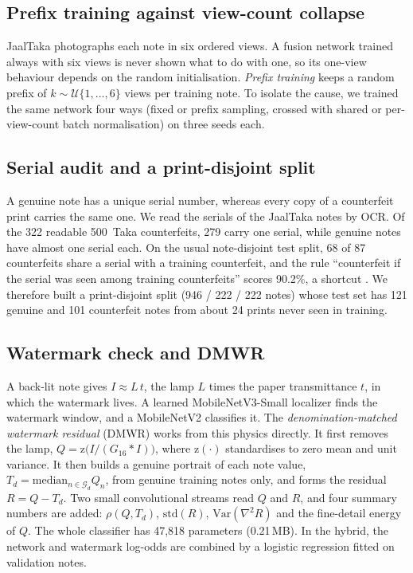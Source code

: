 \documentclass[conference]{IEEEtran}
\begin{document}
\subsection{Prefix training against view-count collapse}
JaalTaka photographs each note in six ordered views. A fusion network trained always with six views is never shown what to do with one, so its one-view behaviour depends on the random initialisation. \emph{Prefix training} keeps a random prefix of $k\sim\mathcal{U}\{1,\dots,6\}$ views per training note. To isolate the cause, we trained the same network four ways (fixed or prefix sampling, crossed with shared or per-view-count batch normalisation) on three seeds each.

\subsection{Serial audit and a print-disjoint split}
A genuine note has a unique serial number, whereas every copy of a counterfeit print carries the same one. We read the serials of the JaalTaka notes by OCR. Of the 322 readable 500~Taka counterfeits, 279 carry one serial, while genuine notes have almost one serial each. On the usual note-disjoint test split, 68 of 87 counterfeits share a serial with a training counterfeit, and the rule ``counterfeit if the serial was seen among training counterfeits'' scores 90.2\%, a shortcut \cite{geirhos2020shortcut}. We therefore built a print-disjoint split (946 / 222 / 222 notes) whose test set has 121 genuine and 101 counterfeit notes from about 24 prints never seen in training.

\subsection{Watermark check and DMWR}
A back-lit note gives $I\approx L\,t$, the lamp $L$ times the paper transmittance $t$, in which the watermark lives. A learned MobileNetV3-Small localizer \cite{mobilenetv3} finds the watermark window, and a MobileNetV2 \cite{mobilenetv2} classifies it. The \emph{denomination-matched watermark residual} (DMWR) works from this physics directly. It first removes the lamp, $Q=\mathrm{z}\big(I/(G_{16}*I)\big)$, where $\mathrm{z}(\cdot)$ standardises to zero mean and unit variance. It then builds a genuine portrait of each note value, $T_d=\mathrm{median}_{n\in\mathcal{G}_d}Q_n$, from genuine training notes only, and forms the residual $R=Q-T_d$. Two small convolutional streams read $Q$ and $R$, and four summary numbers are added: $\rho(Q,T_d)$, $\mathrm{std}(R)$, $\mathrm{Var}(\nabla^2R)$ and the fine-detail energy of $Q$. The whole classifier has 47,818 parameters (0.21\,MB). In the hybrid, the network and watermark log-odds are combined by a logistic regression fitted on validation notes.
\end{document}
